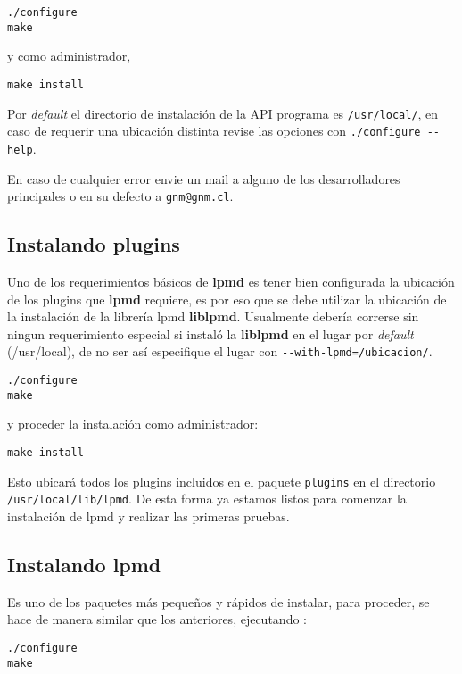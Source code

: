 \documentclass[a4paper,10pt]{scrbook}
\newcommand{\lpmd}{\textbf{lpmd }}
\newcommand{\control}[1]{\begin{center}\begin{minipage}{10cm}\texttt{#1}\end{minipage}\end{center}}
\begin{document}
\control{./configure \\ make}

y como administrador,


\control{make install}


Por \textit{default} el directorio de instalaci\'on de la API programa es \verb|/usr/local/|, en caso de requerir una ubicaci\'on distinta revise las opciones con \verb|./configure --help|.

En caso de cualquier error envie un mail a alguno de los desarrolladores principales o en su defecto a \verb|gnm@gnm.cl|.

\subsection{Instalando plugins}

Uno de los requerimientos b\'asicos de \lpmd es tener bien configurada la ubicaci\'on de los plugins que \lpmd requiere, es por eso que se debe utilizar la ubicaci\'on de la instalaci\'on de la librer\'ia lpmd \textbf{liblpmd}. Usualmente deber\'ia correrse sin ningun requerimiento especial si instal\'o la \textbf{liblpmd} en el lugar por \textit{default} (/usr/local), de no ser as\'i especifique el lugar con \verb|--with-lpmd=/ubicacion/|.

\control{./configure  \\ make}

y proceder la instalaci\'on como administrador:

\control{make install}

Esto ubicar\'a todos los plugins incluidos en el paquete \verb|plugins| en el directorio \verb|/usr/local/lib/lpmd|. De esta forma ya estamos listos para comenzar la instalaci\'on de lpmd y realizar las primeras pruebas.

\subsection{Instalando lpmd}

Es uno de los paquetes m\'as peque\~nos y r\'apidos de instalar, para proceder, se hace de manera similar que los anteriores, ejecutando :

\control{./configure \\ make}
\end{document}

